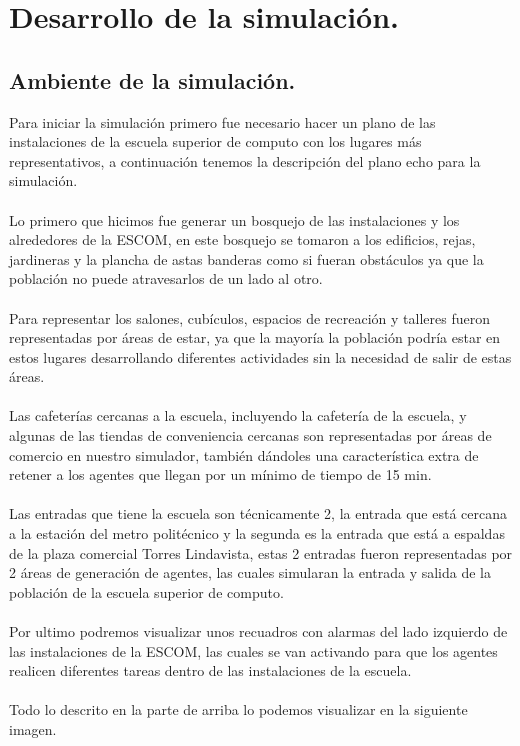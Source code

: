 \documentclass[a4paper,10pt]{article}
\begin{document}
\section{Desarrollo de la simulaci\'on.}
\subsection{Ambiente de la simulaci\'on.}

Para iniciar la simulaci\'on primero fue necesario hacer un plano de las instalaciones de la escuela superior de computo con los lugares m\'as representativos, a continuaci\'on tenemos la descripci\'on del plano echo para la simulaci\'on.
\\ \\
Lo primero que hicimos fue generar un bosquejo de las instalaciones y los alrededores de la ESCOM, en este bosquejo se tomaron a los edificios, rejas, jardineras y la plancha de astas banderas como si fueran obst\'aculos ya que la poblaci\'on no puede atravesarlos de un lado al otro.
\\ \\
Para representar los salones, cub\'iculos, espacios de recreaci\'on y talleres fueron representadas por \'areas de estar, ya que la mayor\'ia la poblaci\'on podr\'ia estar en estos lugares desarrollando diferentes actividades sin la necesidad de salir de estas \'areas.
\\ \\
Las cafeter\'ias cercanas a la escuela, incluyendo la cafeter\'ia de la escuela, y algunas de las tiendas de conveniencia cercanas son representadas por \'areas de comercio en nuestro simulador, tambi\'en d\'andoles una caracter\'istica extra de retener a los agentes que llegan por un m\'inimo de tiempo de 15 min.
\\ \\
Las entradas que tiene la escuela son t\'ecnicamente 2, la entrada que est\'a cercana a la estaci\'on del metro polit\'ecnico y la segunda es la entrada que est\'a a espaldas de la plaza comercial Torres Lindavista, estas 2 entradas fueron representadas por 2 \'areas de generaci\'on de agentes, las cuales simularan la entrada y salida de la poblaci\'on de la escuela superior de computo.
\\ \\
Por ultimo podremos visualizar unos recuadros con alarmas del lado izquierdo de las instalaciones de la ESCOM, las cuales se van activando para que los agentes realicen diferentes tareas dentro de las instalaciones de la escuela.
\\ \\
Todo lo descrito en la parte de arriba lo podemos visualizar en la siguiente imagen.
\\ \\
\end{document}
